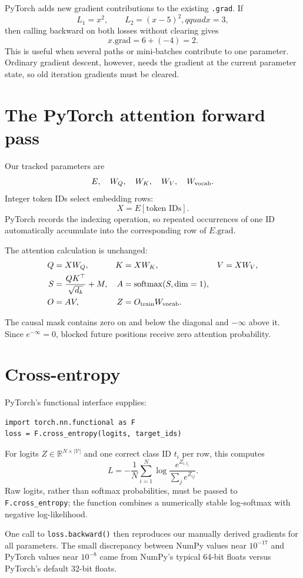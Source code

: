 \documentclass[11pt]{article}
\newcommand{\R}{\mathbb{R}}
\begin{document}
PyTorch adds new gradient contributions to the existing \texttt{.grad}. If
\[
L_1=x^2,\qquad L_2=(x-5)^2,qquad x=3,
\]
then calling backward on both losses without clearing gives
\[
x.\mathrm{grad}=6+(-4)=2.
\]
This is useful when several paths or mini-batches contribute to one parameter. Ordinary gradient descent,
however, needs the gradient at the current parameter state, so old iteration gradients must be cleared.

\section{The PyTorch attention forward pass}

Our tracked parameters are
\[
E,\quad W_Q,\quad W_K,\quad W_V,\quad W_{\rm vocab}.
\]
Integer token IDs select embedding rows:
\[
X=E[\text{token IDs}].
\]
PyTorch records the indexing operation, so repeated occurrences of one ID automatically accumulate into
the corresponding row of $E.\mathrm{grad}$.

The attention calculation is unchanged:
\begin{align}
Q&=XW_Q,&K&=XW_K,&V&=XW_V,\\
S&=\frac{QK^\top}{\sqrt{d_k}}+M,&A&=\operatorname{softmax}(S,\mathrm{dim}=1),\\
O&=AV,&Z&=O_{\rm train}W_{\rm vocab}.
\end{align}

The causal mask contains zero on and below the diagonal and $-\infty$ above it. Since
$e^{-\infty}=0$, blocked future positions receive zero attention probability.

\section{Cross-entropy}

PyTorch's functional interface supplies:
\begin{lstlisting}
import torch.nn.functional as F
loss = F.cross_entropy(logits, target_ids)
\end{lstlisting}
For logits $Z\in\R^{N\times |\mathcal V|}$ and one correct class ID $t_i$ per row, this computes
\[
L=-\frac1N\sum_{i=1}^N\log
\frac{e^{Z_{i,t_i}}}{\sum_j e^{Z_{ij}}}.
\]
Raw logits, rather than softmax probabilities, must be passed to \texttt{F.cross\_entropy}; the function
combines a numerically stable log-softmax with negative log-likelihood.

One call to \texttt{loss.backward()} then reproduces our manually derived gradients for all parameters.
The small discrepancy between NumPy values near $10^{-17}$ and PyTorch values near $10^{-8}$ came from
NumPy's typical 64-bit floats versus PyTorch's default 32-bit floats.
\end{document}
